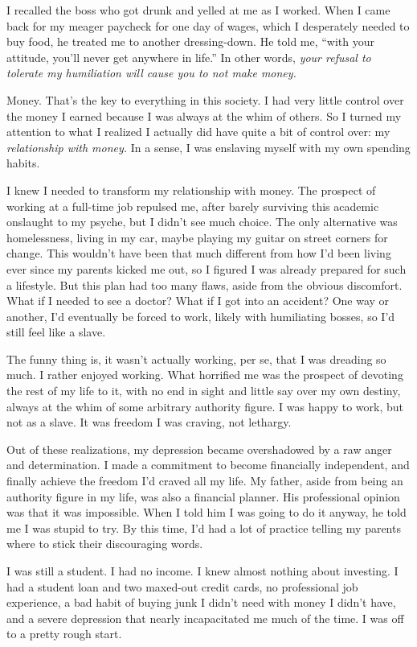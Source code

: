 I recalled the boss who got drunk and yelled at me as I worked. When I came back for my meager paycheck for one day of wages, which I desperately needed to buy food, he treated me to another dressing-down. He told me, ``with your attitude, you'll never get anywhere in life.'' In other words, \emph{your refusal to tolerate my humiliation will cause you to not make money.}

Money. That's the key to everything in this society. I had very little control over the money I earned because I was always at the whim of others. So I turned my attention to what I realized I actually did have quite a bit of control over: my \emph{relationship with money.} In a sense, I was enslaving myself with my own spending habits.

I knew I needed to transform my relationship with money. The prospect of working at a full-time job repulsed me, after barely surviving this academic onslaught to my psyche, but I didn't see much choice. The only alternative was homelessness, living in my car, maybe playing my guitar on street corners for change. This wouldn't have been that much different from how I'd been living ever since my parents kicked me out, so I figured I was already prepared for such a lifestyle. But this plan had too many flaws, aside from the obvious discomfort. What if I needed to see a doctor? What if I got into an accident? One way or another, I'd eventually be forced to work, likely with humiliating bosses, so I'd still feel like a slave.

The funny thing is, it wasn't actually working, per se, that I was dreading so much. I rather enjoyed working. What horrified me was the prospect of devoting the rest of my life to it, with no end in sight and little say over my own destiny, always at the whim of some arbitrary authority figure. I was happy to work, but not as a slave. It was freedom I was craving, not lethargy.

Out of these realizations, my depression became overshadowed by a raw anger and determination. I made a commitment to become financially independent, and finally achieve the freedom I'd craved all my life. My father, aside from being an authority figure in my life, was also a financial planner. His professional opinion was that it was impossible. When I told him I was going to do it anyway, he told me I was stupid to try. By this time, I'd had a lot of practice telling my parents where to stick their discouraging words.

I was still a student. I had no income. I knew almost nothing about investing. I had a student loan and two maxed-out credit cards, no professional job experience, a bad habit of buying junk I didn't need with money I didn't have, and a severe depression that nearly incapacitated me much of the time. I was off to a pretty rough start.

